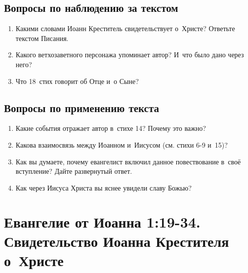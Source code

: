 \documentclass[a4paper,12pt]{article}
\begin{document}
\subsection*{Вопросы по наблюдению за текстом}
\begin{enumerate}
    \item Какими словами Иоанн Креститель свидетельствует о~Христе? Ответьте текстом Писания. 
    
    \myline
    
    \myline

    \item Какого ветхозаветного персонажа упоминает автор? И~что было дано через него? 
    
    \myline
    
    \myline
    \item Что 18~стих говорит об Отце и~о Сыне?
    
    \myline
    
    \myline
\end{enumerate}

\subsection*{Вопросы по применению текста} 
\begin{enumerate}
    \item Какие события отражает автор в~стихе 14? Почему это важно?
    
    \myline
    
    \myline
    \item Какова взаимосвязь между Иоанном и~Иисусом (см. стихи 6-9 и~15)? 
    
    \myline
    
    \myline
    \item Как вы думаете, почему евангелист включил данное повествование в~своё вступление? Дайте развернутый ответ. 
    
    \myline
    
    \myline
    \item Как через Иисуса Христа вы яснее увидели славу Божью?
    
    \myline
    
    \myline
\end{enumerate}



\section{Евангелие от Иоанна 1:19-34. Свидетельство Иоанна Крестителя о~Христе}
\end{document}
